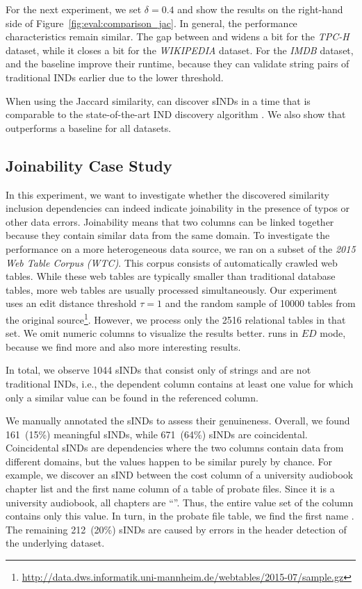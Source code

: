 For the next experiment, we set $\delta = 0.4$ and show the results on the right-hand side of Figure~\ref{fig:eval:comparison_jac}.
In general, the performance characteristics remain similar.
The gap between \sawfish and  widens a bit for the \emph{TPC-H} dataset, while it closes a bit for the \emph{WIKIPEDIA} dataset. 
For the \emph{IMDB} dataset, \sawfish and the baseline improve their runtime, because they can validate string pairs of traditional INDs earlier due to the lower threshold.

When using the Jaccard similarity, \sawfish can discover sINDs in a time that is comparable to the state-of-the-art IND discovery algorithm .
We also show that \sawfish outperforms a baseline for all datasets.

\subsection{Joinability Case Study}
In this experiment, we want to investigate whether the discovered similarity inclusion dependencies can indeed indicate joinability in the presence of typos or other data errors.
Joinability means that two columns can be linked together because they contain similar data from the same domain\cite{chia2019hyperloglog}.
To investigate the performance on a more heterogeneous data source, we ran \sawfish on a subset of the \emph{2015 Web Table Corpus (WTC)}\cite{lehmberg2016corpus}.
This corpus consists of automatically crawled web tables.
While these web tables are typically smaller than traditional database tables, more web tables are usually processed simultaneously.
Our experiment uses an edit distance threshold $\tau = 1$ and the random sample of \num{10000} tables from the original source\footnote{\url{http://data.dws.informatik.uni-mannheim.de/webtables/2015-07/sample.gz}}.
However, we process only the \num{2516} relational tables in that set.
We omit numeric columns to visualize the results better.
\sawfish runs in $ED$ mode, because we find more and also more interesting results.

In total, we observe \num{1044} sINDs that consist only of strings and are not traditional INDs, i.e., the dependent column contains at least one value for which only a similar value can be found in the referenced column.

We manually annotated the sINDs to assess their genuineness.
Overall, we found 161~(15\%) meaningful sINDs, while 671~(64\%) sINDs are coincidental.
Coincidental sINDs are dependencies where the two columns contain data from different domains, but the values happen to be similar purely by chance. 
For example, we discover an sIND between the cost column of a university audiobook chapter list and the first name column of a table of probate files.
Since it is a university audiobook, all chapters are ``''.
Thus, the entire value set of the column contains only this value.
In turn, in the probate file table, we find the first name .
The remaining 212~(20\%) sINDs are caused by errors in the header detection of the underlying dataset.

